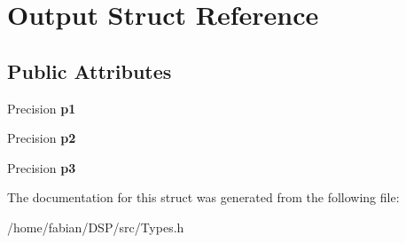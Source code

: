 \hypertarget{structOutput}{\section{Output Struct Reference}
\label{structOutput}
}
\subsection*{Public Attributes}
\begin{DoxyCompactItemize}
\item 
\hypertarget{structOutput_a163e703209cfa99032c3bbde7d8e5a13}{Precision {\bfseries p1}}\label{structOutput_a163e703209cfa99032c3bbde7d8e5a13}

\item 
\hypertarget{structOutput_a842424a54b58de8fd8843b2fea2844a6}{Precision {\bfseries p2}}\label{structOutput_a842424a54b58de8fd8843b2fea2844a6}

\item 
\hypertarget{structOutput_ac938e7e3b0c6162f65e3da212547082a}{Precision {\bfseries p3}}\label{structOutput_ac938e7e3b0c6162f65e3da212547082a}

\end{DoxyCompactItemize}


The documentation for this struct was generated from the following file\-:\begin{DoxyCompactItemize}
\item 
/home/fabian/\-D\-S\-P/src/Types.\-h\end{DoxyCompactItemize}
